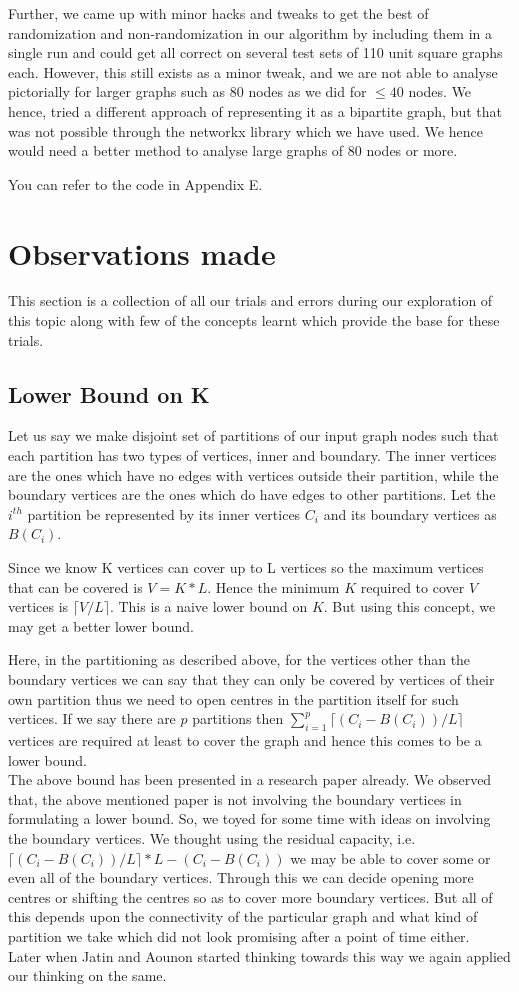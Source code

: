 \documentclass[12pt,a4paper,onecolumn]{article}
\begin{document}
 Further, we came up with minor hacks and tweaks to get the best of randomization and non-randomization in our algorithm by including them in a single run and could get all correct on several test sets of 110 unit square graphs each. However, this still exists as a minor tweak, and we are not able to analyse pictorially for larger graphs such as 80 nodes as we did for $\leq 40$ nodes. We hence, tried a different approach of representing it as a bipartite graph, but that was not possible through the networkx library which we have used. We hence would need a better method to analyse large graphs of 80 nodes or more.

You can refer to the code in Appendix E.
\section{Observations made}
This section is a collection of all our trials and errors during our exploration of this topic along with few of the concepts learnt which provide the base for these trials.
\subsection{Lower Bound on K}
Let us say we make disjoint set of partitions of our input graph nodes such that each partition has two types of vertices, inner and boundary. The inner vertices are the ones which have no edges with vertices outside their partition, while the boundary vertices are the ones which do have edges to other partitions. Let the $i^{th}$ partition be represented by its inner vertices $C_i$ and its boundary vertices as $B(C_i)$.

Since we know K vertices can cover up to L vertices so the maximum vertices that can be covered is $V = K*L$. Hence the minimum $K$ required to cover $V$ vertices is $\lceil V/L\rceil$. This is a naive lower bound on $K$. But using this concept, we may get a better lower bound. 

Here, in the partitioning as described above, for the vertices other than the boundary vertices we can say that they can only be covered by vertices of their own partition thus we need to open centres in the partition itself for such vertices. If we say there are $p$ partitions then $\sum_{i=1}^{p}\lceil (C_i-B(C_i))/L\rceil$ vertices are required at least to cover the graph and hence this comes to be a lower bound. \\The above bound has been presented in a research paper already. We observed that, the above mentioned paper is not involving the boundary vertices in formulating a lower bound. So, we toyed for some time with ideas on involving the boundary vertices. We thought using the residual capacity, i.e. $\lceil (C_i-B(C_i))/L\rceil*L-(C_i-B(C_i))$ we may be able to cover some or even all of the boundary vertices. Through this we can decide opening more centres or shifting the centres so as to cover more boundary vertices. But all of this depends upon the connectivity of the particular graph and what kind of partition we take which did not look promising after a point of time either.\\ Later when Jatin and Aounon started thinking towards this way we again applied our thinking on the same.
\end{document}
